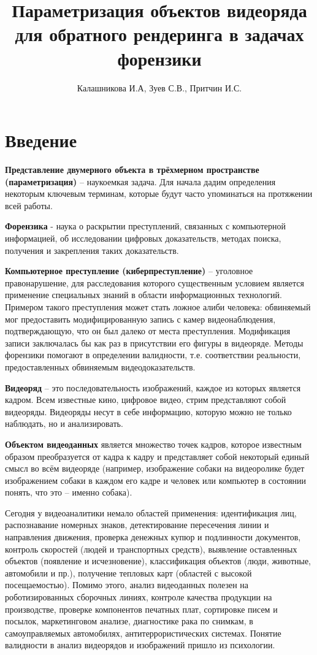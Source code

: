 \documentclass[]{article}
\title{Параметризация объектов видеоряда для обратного рендеринга в задачах форензики}
\author{Калашникова И.А, Зуев С.В., Притчин И.С.}
\begin{document}
\maketitle

\begin{abstract}

\end{abstract}

\section*{Введение}
\textbf{Представление двумерного объекта в трёхмерном пространстве (параметризация)} – наукоемкая задача. Для начала дадим определения некоторым ключевым терминам, которые будут часто упоминаться на протяжении всей работы. 

\textbf{Форензика} - наука о раскрытии преступлений, связанных с компьютерной информацией, об исследовании цифровых доказательств, методах поиска, получения и закрепления таких доказательств. 

\textbf{Компьютерное преступление (киберпреступление)} – уголовное правонарушение, для расследования которого существенным условием является применение специальных знаний в области информационных технологий. Примером такого преступления может стать ложное алиби человека: обвиняемый мог предоставить модифицированную запись с камер видеонаблюдения, подтверждающую, что он был далеко от места преступления. Модификация записи заключалась бы как раз в присутствии его фигуры в видеоряде. Методы форензики помогают в определении валидности, т.е. соответствии реальности, предоставленных обвиняемым видеодоказательств.

\textbf{Видеоряд} – это последовательность изображений, каждое из которых является кадром. Всем известные кино, цифровое видео, стрим представляют собой видеоряды. Видеоряды несут в себе информацию, которую можно не только наблюдать, но и анализировать.

\textbf{Объектом видеоданных} является множество точек кадров, которое известным образом преобразуется от кадра к кадру и представляет собой некоторый единый смысл во всём видеоряде (например, изображение собаки на видеоролике будет изображением собаки в каждом его кадре и человек или компьютер в состоянии понять, что это – именно собака).

Сегодня у видеоаналитики немало областей применения: идентификация лиц, распознавание номерных знаков, детектирование пересечения линии и направления движения, проверка денежных купюр и подлинности документов, контроль скоростей (людей и транспортных средств), выявление оставленных объектов (появление и исчезновение), классификация объектов (люди, животные, автомобили и пр.), получение тепловых карт (областей с высокой посещаемостью). Помимо этого, анализ видеоданных полезен на роботизированных сборочных линиях, контроле качества продукции на производстве, проверке компонентов печатных плат, сортировке писем и посылок, маркетинговом анализе, диагностике рака по снимкам, в самоуправляемых автомобилях, антитеррористических системах.
Понятие валидности в анализ видеорядов и изображений пришло из психологии.
\end{document}
